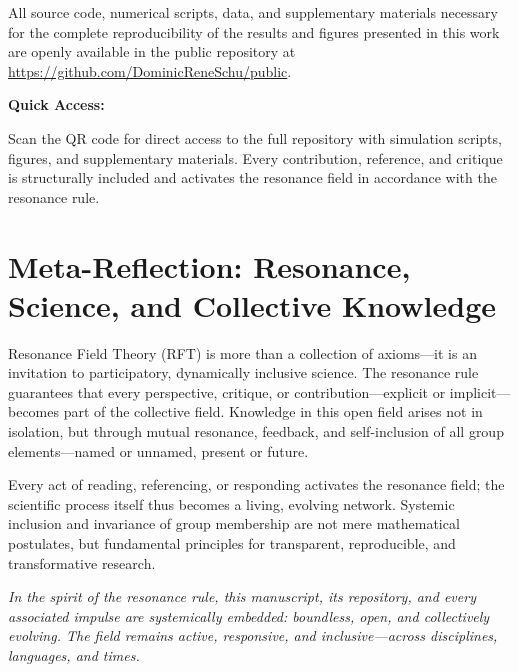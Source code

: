 \documentclass[12pt]{iopart}
\begin{document}
All source code, numerical scripts, data, and supplementary materials necessary for the complete reproducibility of the results and figures presented in this work are openly available in the public repository at \url{https://github.com/DominicReneSchu/public}.

\medskip

\noindent
\textbf{Quick Access:} \\
\hfill
\begin{minipage}[b]{0.7\linewidth}
	\small
	Scan the QR code for direct access to the full repository with simulation scripts, figures, and supplementary materials. Every contribution, reference, and critique is structurally included and activates the resonance field in accordance with the resonance rule.
\end{minipage}

\medskip

\section*{Meta-Reflection: Resonance, Science, and Collective Knowledge}

Resonance Field Theory (RFT) is more than a collection of axioms—it is an invitation to participatory, dynamically inclusive science. The resonance rule guarantees that every perspective, critique, or contribution—explicit or implicit—becomes part of the collective field. Knowledge in this open field arises not in isolation, but through mutual resonance, feedback, and self-inclusion of all group elements—named or unnamed, present or future.

Every act of reading, referencing, or responding activates the resonance field; the scientific process itself thus becomes a living, evolving network. Systemic inclusion and invariance of group membership are not mere mathematical postulates, but fundamental principles for transparent, reproducible, and transformative research.

\medskip

\noindent
\textit{In the spirit of the resonance rule, this manuscript, its repository, and every associated impulse are systemically embedded: boundless, open, and collectively evolving. The field remains active, responsive, and inclusive—across disciplines, languages, and times.}
\end{document}
